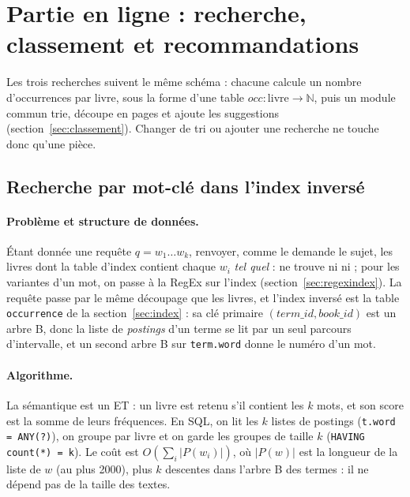 \section{Partie en ligne : recherche, classement et recommandations}
\label{sec:enligne}

Les trois recherches suivent le même schéma : chacune calcule un nombre
d'occurrences par livre, sous la forme d'une table $\mathit{occ} : \text{livre}
\to \mathbb{N}$, puis un module commun trie, découpe en pages et ajoute les
suggestions (section~\ref{sec:classement}). Changer de tri ou ajouter une
recherche ne touche donc qu'une pièce.

\subsection{Recherche par mot-clé dans l'index inversé}
\label{sec:motcle}

\paragraph{Problème et structure de données.} Étant donnée une requête
$q = w_1 \dots w_k$, renvoyer, comme le demande le sujet, les livres dont la
table d'index contient chaque $w_i$ \emph{tel quel} :  ne trouve
ni  ni  ; pour les variantes d'un mot, on passe à
la RegEx  sur l'index (section~\ref{sec:regexindex}). La requête
passe par le même découpage que les livres, et l'index inversé est la table
\texttt{occurrence} de la section~\ref{sec:index} : sa clé primaire
$(\mathit{term\_id}, \mathit{book\_id})$ est un arbre B, donc la liste de
\emph{postings} d'un terme se lit par un seul parcours d'intervalle, et un
second arbre B sur \texttt{term.word} donne le numéro d'un mot.

\paragraph{Algorithme.} La sémantique est un ET : un livre est retenu s'il
contient les $k$ mots, et son score est la somme de leurs fréquences. En SQL,
on lit les $k$ listes de postings (\texttt{t.word = ANY(?)}), on groupe par
livre et on garde les groupes de taille $k$ (\texttt{HAVING count(*) = k}). Le
coût est $O(\sum_i |P(w_i)|)$, où $|P(w)|$ est la longueur de la liste
de $w$ (au plus 2000), plus $k$ descentes dans l'arbre B des termes : il ne
dépend pas de la taille des textes.

